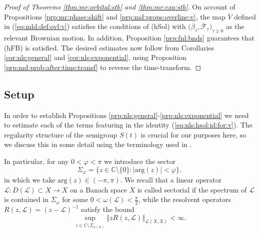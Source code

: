 \documentclass[10pt]{articleHJ}
\newcommand{\abs}[1]{\left\vert#1\right\vert}			%
\newcommand{\norm}[1]{\left\Vert#1\right\Vert}		%
\newcommand{\sref}[1]{(\ref{#1})}                       %
\numberwithin{equation}{section}
\begin{document}
\begin{proof}[Proof of Theorems \ref{thm:mr:orbital:stb} and \ref{thm:mr:exp:stb}]
On account of Propositions \ref{prp:mr:phase:shift}
and
\ref{prp:md:props:overline:v},
the map $\overline{V}$
defined in \sref{eq:mld:def:ovl:v}
satisfies the conditions of (hSol)
with $\big(\overline{\beta}_\tau , \overline{\mathcal{F}}_\tau \big)_{\tau \ge 0}$
as the relevant Brownian motion.  In addition, Proposition
\ref{prp:fnl:bnds} guarantees that (hFB) is satisfied.
The desired estimates now follow
from Corollaries \ref{cor:nls:general} and \ref{cor:nls:exponential},
using Proposition \ref{prp:md:prob:after:time:transf}
to reverse the time-transform.
\end{proof}



\subsection{Setup}
\label{sec:nls:setup}
In order to
establish Propositions
\ref{prp:nls:general}-\ref{prp:nls:exponential}
we need to estimate each of the terms
featuring in the identity
\sref{eq:nls:hsol:id:for:v}.
The regularity structure of the
semigroup $S(t)$ is crucial for our
purposes here, so we discuss this in some detail
using the terminology used in \cite[{\S}10]{hytonen2018analysis}.

In particular, for any $0 < \varphi < \pi$
we introduce the sector
\begin{equation}
\Sigma_{\varphi} = \{z \in \mathbb{C} \setminus \{ 0 \} :
\abs{ \mathrm{arg}(z) }  < \varphi \},
\end{equation}
in which we take $\mathrm{arg}(z) \in (-\pi, \pi)$.
We recall that a linear operator
$\mathcal{L}: D(\mathcal{L}) \subset X \to X$
on a Banach space $X$
is called sectorial if the spectrum of $\mathcal{L}$
is contained in $\overline{\Sigma}_{\omega}$
for some $0 < \omega(\mathcal{L}) < \frac{\pi}{2}$,
while the resolvent operators $R(z, \mathcal{L}) = (z - \mathcal{L})^{-1}$
satisfy the bound
\begin{equation}
\sup_{z \in \mathbb{C} \setminus  \overline{\Sigma}_{\omega(\mathcal{L})} }
  \norm{z R(z, \mathcal{L}) }_{\mathcal{L}(X,X)}
   < \infty .
\end{equation}
\end{document}
